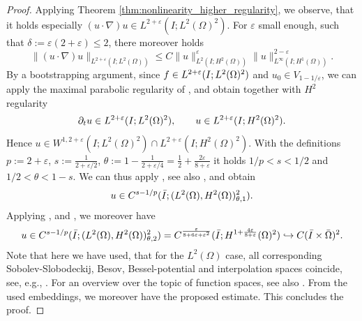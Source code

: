 \documentclass{m2an}
\newcommand\blue[1]{\textcolor{black}{#1}}
\newcommand{\LinfHone}{L^\infty(I;H^1(\Omega))}
\newcommand{\LtwoHtwo}{L^2(I;H^2(\Omega))}
\begin{document}
\begin{proof}
  Applying Theorem \ref{thm:nonlinearity_higher_regularity}, we observe, that it holds especially 
  $(u\cdot \nabla) u \in L^{2+\varepsilon}(I;L^2(\Omega)^2)$.
  For $\varepsilon$ small enough, such that $\delta := \varepsilon (2 + \varepsilon) \le 2$, 
  there moreover holds
  \begin{equation*}
    \|(u\cdot \nabla) u \|_{L^{2+\varepsilon}(I;L^2(\Omega))} 
    \le C \|u\|_{\LtwoHtwo}^{\varepsilon} \|u\|_{\LinfHone}^{2 - \varepsilon}.
  \end{equation*}
  By a bootstrapping argument, since $f \in L^{2+\varepsilon}(I;\blue{L^2(\Omega)^2})$ and 
  $u_0 \in V_{1-1/\varepsilon}$, we can apply the maximal parabolic regularity 
  of , and obtain together with $H^2$ regularity
  \begin{equation*}
    \partial_t u \in L^{2+\varepsilon}(I;\blue{L^2(\Omega)^2}), \qquad u \in L^{2+\varepsilon}(I;\blue{H^2(\Omega)^2}).
  \end{equation*}
  Hence
  $u \in W^{1,2+\varepsilon}(I;L^2(\Omega)^2) \cap L^{2+\varepsilon}(I;H^2(\Omega)^2)$.
  With the definitions $p:= 2+ \varepsilon$, $s:= \frac{1}{2 + \varepsilon/2}$,
  $\theta := 1 - \frac{1}{2+\varepsilon/4} = \frac{1}{2} + \frac{2\varepsilon}{8 + \varepsilon}$ it holds
  $1/p < s < 1/2$ and $1/2 < \theta < 1 - s$.
  We can thus apply \cite[Theorem 3]{Amann2001}, see also \cite[Lemma 2.11 b)]{disser_holder_2017},
  and obtain
  \begin{equation*}
    u \in C^{s- 1/p}(\blue{\bar I};(L^2(\Omega),H^2(\Omega))_{\theta,1}^2).
  \end{equation*}
  Applying 
  \cite[Theorems 3.4.1 \& 6.4.5]{bergh_interpolation_1976}, and 
  \cite[Theorem 4.57]{demengel_functional_2012}, %
  we moreover have
    \begin{align*}
      u \in C^{s - 1/p}(\blue{\bar I;(L^2(\Omega),H^2(\Omega))_{\theta,2}^2})
      = C^{ \frac{\varepsilon}{8 + 6 \varepsilon+ \varepsilon^2}}
      (\blue{\bar I};H^{1+ \frac{4\varepsilon}{8 + \varepsilon}}(\Omega)^2)
            \hookrightarrow C(\bar I \times \bar \Omega)^2.
    \end{align*}
  Note that here we have used, that for the $L^2(\Omega)$ case, all corresponding
  Sobolev-Slobodeckij, Besov, Bessel-potential and interpolation spaces coincide, see, e.g.,
  \cite{magenes_interpolational_1966}. For an overview over the topic of function spaces, see also
  \cite{triebel_theory_1992}. From the used embeddings, we moreover have the proposed estimate.
  This concludes the proof.
\end{proof}
\end{document}
